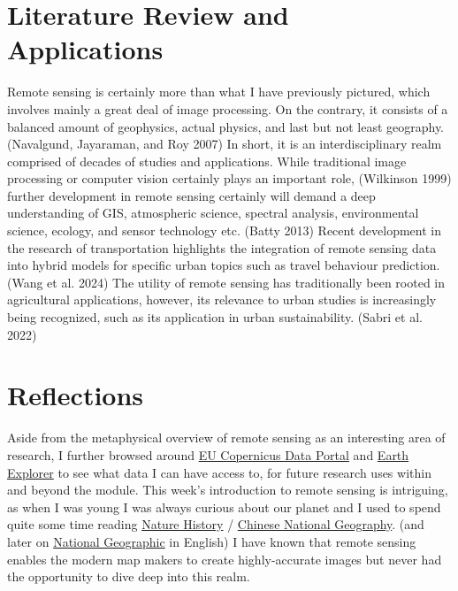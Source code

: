 \documentclass[
  letterpaper,
  DIV=11,
  numbers=noendperiod]{scrreprt}
\begin{document}
\hypertarget{literature-review-and-applications}{%
\section*{Literature Review and
Applications}\label{literature-review-and-applications}}


Remote sensing is certainly more than what I have previously pictured,
which involves mainly a great deal of image processing. On the contrary,
it consists of a balanced amount of geophysics, actual physics, and last
but not least geography. (Navalgund, Jayaraman, and Roy 2007) In short,
it is an interdisciplinary realm comprised of decades of studies and
applications. While traditional image processing or computer vision
certainly plays an important role, (Wilkinson 1999) further development
in remote sensing certainly will demand a deep understanding of GIS,
atmospheric science, spectral analysis, environmental science, ecology,
and sensor technology etc. (Batty 2013) Recent development in the
research of transportation highlights the integration of remote sensing
data into hybrid models for specific urban topics such as travel
behaviour prediction.(Wang et al. 2024) The utility of remote sensing
has traditionally been rooted in agricultural applications, however, its
relevance to urban studies is increasingly being recognized, such as its
application in urban sustainability. (Sabri et al. 2022)

\hypertarget{reflections}{%
\section*{Reflections}\label{reflections}}


Aside from the metaphysical overview of remote sensing as an interesting
area of research, I further browsed around
\href{https://dataspace.copernicus.eu/}{EU Copernicus Data Portal} and
\href{https://earthexplorer.usgs.gov}{Earth Explorer} to see what data I
can have access to, for future research uses within and beyond the
module. This week's introduction to remote sensing is intriguing, as
when I was young I was always curious about our planet and I used to
spend quite some time reading \href{http://www.dili360.com/nh/}{Nature
History} / \href{http://www.dili360.com/}{Chinese National Geography}.
(and later on \href{https://www.nationalgeographic.com/}{National
Geographic} in English) I have known that remote sensing enables the
modern map makers to create highly-accurate images but never had the
opportunity to dive deep into this realm.
\end{document}
